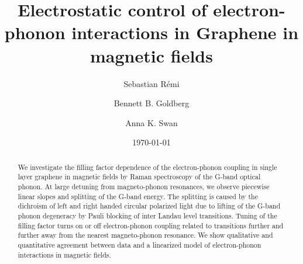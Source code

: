\documentclass[prl,aps,superscriptaddress,showpacs,reprint]{revtex4-1}
\begin{document}
\title{Electrostatic control of electron-phonon interactions in Graphene in magnetic fields} %

\author{Sebastian R\'{e}mi}

\author{Bennett B. Goldberg}


\author{Anna K. Swan}

\date{\today}

\begin{abstract}
We investigate the filling factor dependence of the electron-phonon coupling in single layer graphene in magnetic fields by Raman spectroscopy of the G-band optical phonon. At large detuning from magneto-phonon resonances, we observe piecewise linear slopes and splitting of the G-band energy. The splitting is caused by the dichroism of left and right handed circular polarized light due to lifting of the G-band phonon degeneracy by Pauli blocking of inter Landau level transitions. Tuning of the filling factor turns on or off electron-phonon coupling related to transitions further and further away from the nearest magneto-phonon resonance.  We show qualitative and quantitative agreement between data and a linearized model of electron-phonon interactions in magnetic fields.
\end{abstract}






\maketitle %
\end{document}
